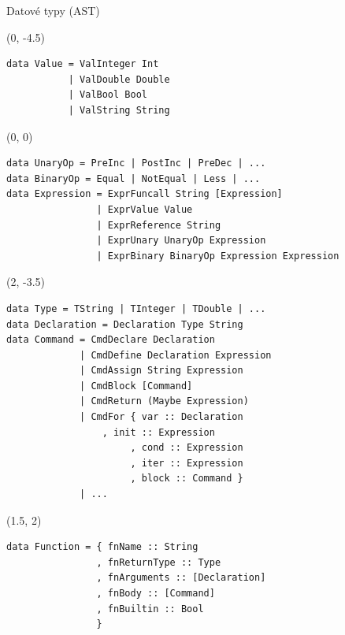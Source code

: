 \documentclass[13pt]{beamer}
\begin{document}
\begin{frame}[fragile]{Datové typy (AST)}

\TPMargin{5pt}

\begin{textblock}{10}(0, -4.5)
\begin{verbatim}
data Value = ValInteger Int
           | ValDouble Double
           | ValBool Bool
           | ValString String
\end{verbatim}
\end{textblock}

\pause
\begin{textblock}{16}(0, 0)
\begin{verbatim}
data UnaryOp = PreInc | PostInc | PreDec | ...
data BinaryOp = Equal | NotEqual | Less | ...
data Expression = ExprFuncall String [Expression]
                | ExprValue Value
                | ExprReference String
                | ExprUnary UnaryOp Expression
                | ExprBinary BinaryOp Expression Expression
\end{verbatim}
\end{textblock}

\pause
\begin{textblock}{14}(2, -3.5)
\begin{verbatim}
data Type = TString | TInteger | TDouble | ...
data Declaration = Declaration Type String
data Command = CmdDeclare Declaration
             | CmdDefine Declaration Expression
             | CmdAssign String Expression
             | CmdBlock [Command]
             | CmdReturn (Maybe Expression)
             | CmdFor { var :: Declaration
             	 , init :: Expression
                      , cond :: Expression
                      , iter :: Expression
                      , block :: Command }
             | ...
\end{verbatim}
\end{textblock}

\pause
\begin{textblock}{13.5}(1.5, 2)
\begin{verbatim}
data Function = { fnName :: String
                , fnReturnType :: Type
                , fnArguments :: [Declaration]
                , fnBody :: [Command]
                , fnBuiltin :: Bool
                }
\end{verbatim}
\end{textblock}

\end{frame}
\end{document}
